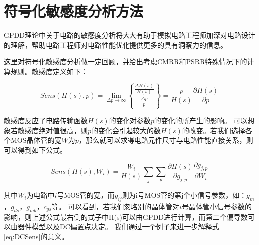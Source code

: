 \section{符号化敏感度分析方法}
\label{sec:cmps:sens}

GPDD理论中关于电路的敏感度分析将大大有助于模拟电路工程师加深对电路设计的理解，帮助电路工程师对电路性能优化提供更多的具有洞察力的信息\parencite{MengXiaoxuan-Sens-2009,WengBinbin-Sens-2011,ChenJiajun-Sens-2012}。

这里对符号化敏感度分析做一定回顾，并给出考虑CMRR和PSRR特殊情况下的计算规则。敏感度定义如下：

\begin{equation}
Sens\left( {H\left( s \right),p} \right) = \mathop {\lim }\limits_{\Delta p \to \infty } \left\{ {\frac{{\frac{{\Delta H\left( s \right)}}{{H\left( s \right)}}}}{{\frac{{\Delta p}}{p}}}} \right\} = \frac{p}{{H\left( s \right)}}\frac{{\partial H\left( s \right)}}{{\partial p}}
\end{equation}

敏感度反应了电路传输函数$H\left(s\right)$的变化对参数$p$的变化的所产生的影响。
可以想象若敏感度绝对值很高，则$p$的变化会引起较大的数$H\left(s\right)$的改变。若我们选择各个MOS晶体管的宽$W$为$p$，那么就可以求得电路元件尺寸与电路性能直接关系，则可以得到如下公式。

\begin{equation}\label{eq:DCSens}
Sens\left( {H\left( s \right),{W_i}} \right) = \frac{{{W_i}}}{{H\left( s \right)}} \sum\limits_{j} \sum\limits_{p} {\frac{{\partial H\left( s \right)}}{{\partial {g_{j,p}}}}\frac{{\partial {g_{j,p}}}}{{\partial {W_i}}}}
\end{equation}

其中$W_i$为电路中$i$号MOS管的宽，而$g_{ij}$则为i号MOS管的第j个小信号参数，如：$g_m$，$g_{ds}$，$g_{mb}$，$c_{gs}$等。
可以看到，若我们忽略别的晶体管对$i$号晶体管小信号参数的影响，则上述公式最右侧的式子中H(s)可以由GPDD进行计算，而第二个偏导数可以由器件模型以及DC偏置点决定。
我们通过一个例子来进一步解释式\ref{eq:DCSens}的意义。

